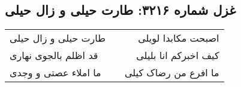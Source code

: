 \begin{center}
\section*{غزل شماره ۳۲۱۶: طارت حیلی و زال حیلی}
\label{sec:3216}
\begin{longtable}{l p{0.5cm} r}
طارت حیلی و زال حیلی
&&
اصبحت مکابدا لویلی
\\
قد اظلم بالجوی نهاری
&&
کیف اخبرکم انا بلیلی
\\
ما املاء عصتی و وجدی
&&
ما افرع من رضاک کیلی
\\
\end{longtable}
\end{center}
